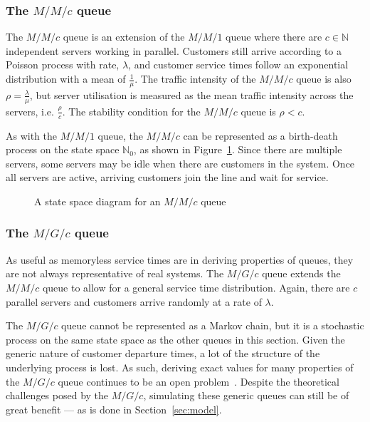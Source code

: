 \subsubsection{The \(M/M/c\) queue}

The \(M/M/c\) queue is an extension of the \(M/M/1\) queue where there are \(c
\in \mathbb N\) independent servers working in parallel. Customers still arrive
according to a Poisson process with rate, \(\lambda\), and customer service
times follow an exponential distribution with a mean of \(\frac{1}{\mu}\). The
traffic intensity of the \(M/M/c\) queue is also \(\rho = \frac{\lambda}{\mu}\),
but server utilisation is measured as the mean traffic intensity across the
servers, i.e.  \(\frac{\rho}{c}\). The stability condition for the \(M/M/c\)
queue is \(\rho < c\). 

As with the \(M/M/1\) queue, the \(M/M/c\) can be represented as a birth-death
process on the state space \(\mathbb N_0\), as shown in
Figure~\ref{fig:birth_death_mmc}. Since there are multiple servers, some servers
may be idle when there are customers in the system. Once all servers are active,
arriving customers join the line and wait for service. 

\begin{figure}[htbp]
    \centering
    \resizebox{\imgwidth}{!}{%
        
    }\caption{
        A state space diagram for an \(M/M/c\) queue%
    }\label{fig:birth_death_mmc}
\end{figure}

\subsubsection{The \(M/G/c\) queue}

As useful as memoryless service times are in deriving properties of queues, they
are not always representative of real systems. The \(M/G/c\) queue extends the
\(M/M/c\) queue to allow for a general service time distribution. Again, there
are \(c\) parallel servers and customers arrive randomly at a rate of
\(\lambda\).

The \(M/G/c\) queue cannot be represented as a Markov chain, but it is a
stochastic process on the same state space as the other queues in this section.
Given the generic nature of customer departure times, a lot of the structure of
the underlying process is lost. As such, deriving exact values for many
properties of the \(M/G/c\) queue continues to be an open
problem~\cite{Kingman2009}. Despite the theoretical challenges posed by the
\(M/G/c\), simulating these generic queues can still be of great benefit --- as
is done in Section~\ref{sec:model}. 

